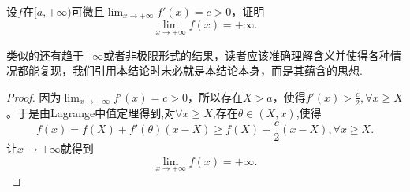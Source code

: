\documentclass[../../main.tex]{subfiles}%
\begin{document}
\begin{proposition}[导数有正增长率则函数爆炸]\label{proposition:导数有正增长率则函数爆炸}
设\(f\)在\([a,+\infty)\)可微且\(\lim_{x\rightarrow +\infty}f'(x)=c > 0\)，证明
\[\lim_{x\rightarrow +\infty}f(x)=+\infty.\]
\end{proposition}
\begin{note}
类似的还有趋于\(-\infty\)或者非极限形式的结果，读者应该准确理解含义并使得各种情况都能复现，我们引用本结论时未必就是本结论本身，而是其蕴含的思想.
\end{note}
\begin{proof}

因为\(\lim_{x\rightarrow +\infty}f'(x)=c > 0\)，所以存在\(X > a\)，使得\(f'(x)>\frac{c}{2},\forall x\geqslant X\)。于是由Lagrange中值定理得到,对$\forall x\geqslant X$,存在$\theta \in (X,x)$,使得
\[f(x)=f(X)+f'(\theta)(x - X)\geqslant f(X)+\frac{c}{2}(x - X),\forall x\geqslant X.\]
让\(x\rightarrow +\infty\)就得到
\[\lim_{x\rightarrow +\infty}f(x)=+\infty.\]

\end{proof}
\end{document}
